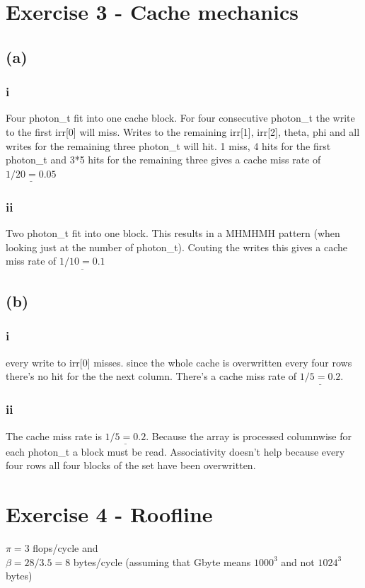 \documentclass[10pt,a4paper,oneside,notitlepage]{report}
\begin{document}
\section*{Exercise 3 - Cache mechanics}
\subsection*{(a)}
\subsubsection*{i}
Four photon\_t fit into one cache block. For four consecutive photon\_t the write to the first irr[0] will miss. Writes to the remaining irr[1], irr[2], theta, phi and all writes for the remaining three photon\_t will hit. 1 miss, 4 hits for the first photon\_t and 3*5 hits for the remaining three gives a cache miss rate of $\underline{1/20=0.05}$
\subsubsection*{ii}
Two photon\_t fit into one block. This results in a MHMHMH pattern (when looking just at the number of photon\_t). Couting the writes this gives a cache miss rate of $\underline{1/10=0.1}$
\subsection*{(b)}
\subsubsection*{i}
every write to irr[0] misses. since the whole cache is overwritten every four rows there's no hit for the the next column. There's a cache miss rate of $\underline{1/5=0.2}$.
\subsubsection*{ii}
The cache miss rate is $\underline{1/5=0.2}$. Because the array is processed columnwise for each photon\_t a block must be read. Associativity doesn't help because every four rows all four blocks of the set have been overwritten.

\section*{Exercise 4 - Roofline}
$\pi = 3$ flops/cycle and \\
$\beta = 28/3.5 =8$ bytes/cycle (assuming that Gbyte means $1000^3$ and not $1024^3$ bytes)
\end{document}
